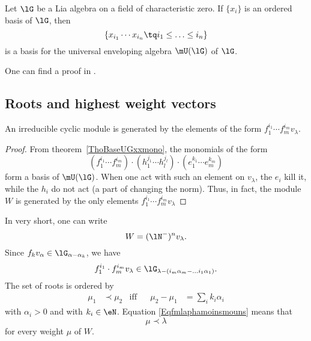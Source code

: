 \begin{theorem}     \label{ThoBaseUGxxmono}
    Let $\lG$ be a Lia algebra on a field of characteristic zero. If $\{ x_i \}$ is an ordered basis of $\lG$, then
    \begin{equation}
        \{ x_{i_1}\cdots x_{i_n}\tq i_1\leq\ldots\leq i_n \}
    \end{equation}
    is a basis for the universal enveloping algebra $\mU(\lG)$ of $\lG$.
\end{theorem}
One can find a proof in \cite{DirkEnvFiniteDimNilLieAlg}.

                    \subsection{Roots and highest weight vectors}

\begin{proposition}     \label{PropoIrrrgenffflamble}
An irreducible cyclic module is generated by the elements of the form $f_1^{i_1}\cdots f_m^{i_m}v_{\lambda}$.
\end{proposition}

\begin{proof}
    From theorem~\ref{ThoBaseUGxxmono}, the monomials of the form
    \begin{equation}
        (f_1^{i_1}\cdots f_m^{i_m})\cdot (h_1^{j_1}\cdots h_l^{j_l})\cdot (e_1^{k_1}\cdots e_m^{k_m})
    \end{equation}
    form a basis of $\mU(\lG)$. When one act with such an element on $v_{\lambda}$, the $e_i$ kill it, while the $h_i$ do not act (a part of changing the norm). Thus, in fact, the module $W$ is generated by the only elements $f_1^{i_1}\cdots f_m^{i_m}v_{\lambda}$
\end{proof}
In very short, one can write
\begin{equation}        \label{EqWnmoinvlambldarootmodul}
    W=(\lN^-)^nv_{\lambda}.
\end{equation}
Since $f_kv_{\alpha}\in\lG_{\alpha-\alpha_k}$, we have
\begin{equation}        \label{Eqfmlaphamoinsmouns}
    f_1^{i_1}\cdot f_m^{i_m}v_{\lambda}\in\lG_{\lambda-(i_m\alpha_m-\ldots i_1\alpha_1)}.
\end{equation}
The set of roots is ordered by
\begin{equation}
    \begin{aligned}
        \mu_1&\prec\mu_2    &   \text{iff}  &&  \mu_2-\mu_1&=\sum_i k_i\alpha_i
    \end{aligned}
\end{equation}
with $\alpha_i>0$ and with $k_i\in\eN$. Equation \eqref{Eqfmlaphamoinsmouns} means that
\begin{equation}
    \mu\prec\lambda
\end{equation}
for every weight $\mu$ of $W$.

